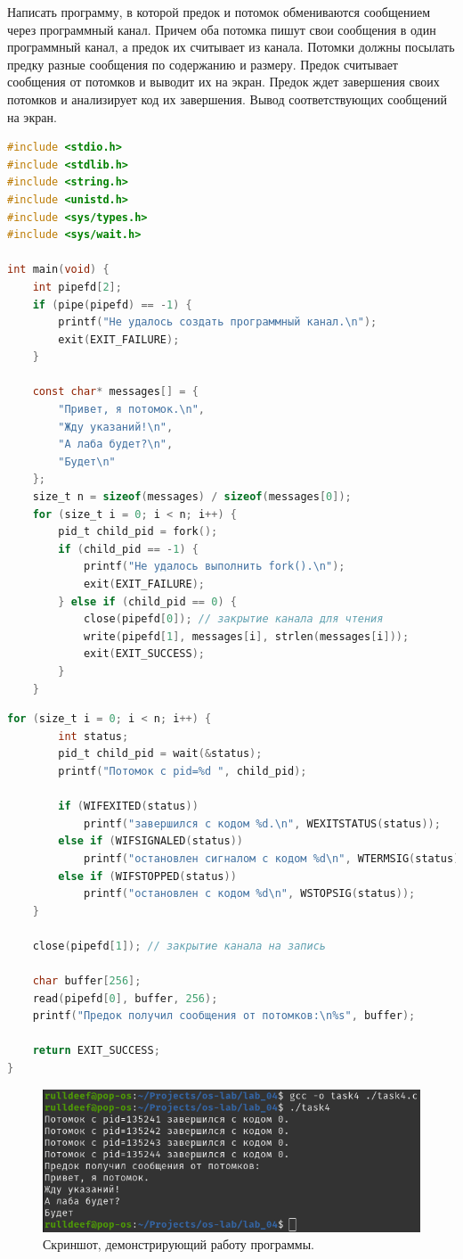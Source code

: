 Написать программу, в которой предок и потомок обмениваются сообщением через программный канал. Причем оба потомка пишут свои сообщения в один программный канал, а предок их считывает из канала. Потомки должны посылать предку разные сообщения по содержанию и размеру. Предок считывает сообщения от потомков и выводит их на экран. Предок ждет завершения своих потомков и анализирует код их завершения. Вывод соответствующих сообщений на экран.

\begin{lstlisting}[language=C,caption=Исходный код для задания 4 (Часть 1).]
#include <stdio.h>
#include <stdlib.h>
#include <string.h>
#include <unistd.h>
#include <sys/types.h>
#include <sys/wait.h>

int main(void) {
	int pipefd[2];
	if (pipe(pipefd) == -1) {
		printf("Не удалось создать программный канал.\n");
		exit(EXIT_FAILURE);
	}
	
	const char* messages[] = {
		"Привет, я потомок.\n",
		"Жду указаний!\n",
		"А лаба будет?\n",
		"Будет\n"
	};
	size_t n = sizeof(messages) / sizeof(messages[0]);
	for (size_t i = 0; i < n; i++) {
		pid_t child_pid = fork();
		if (child_pid == -1) {
			printf("Не удалось выполнить fork().\n");
			exit(EXIT_FAILURE);
		} else if (child_pid == 0) {
			close(pipefd[0]); // закрытие канала для чтения
			write(pipefd[1], messages[i], strlen(messages[i]));
			exit(EXIT_SUCCESS);
		}
	}
\end{lstlisting}

\clearpage

\begin{lstlisting}[language=C,firstnumber=33,caption=Исходный код для задания 4 (Часть 2).]
	for (size_t i = 0; i < n; i++) {
		int status;
		pid_t child_pid = wait(&status);
		printf("Потомок с pid=%d ", child_pid);
		
		if (WIFEXITED(status))
			printf("завершился с кодом %d.\n", WEXITSTATUS(status));
		else if (WIFSIGNALED(status))
			printf("остановлен сигналом с кодом %d\n", WTERMSIG(status));
		else if (WIFSTOPPED(status))
			printf("остановлен с кодом %d\n", WSTOPSIG(status));
	}
	
	close(pipefd[1]); // закрытие канала на запись
	
	char buffer[256];
	read(pipefd[0], buffer, 256);
	printf("Предок получил сообщения от потомков:\n%s", buffer);
	
	return EXIT_SUCCESS;
}
\end{lstlisting}

\begin{figure}[ht]
	\centering
	\includegraphics[width=\linewidth]{img/task4.png}
	\caption{Скриншот, демонстрирующий работу программы.}
\end{figure}

